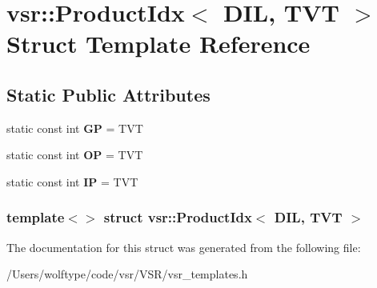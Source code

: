 \hypertarget{structvsr_1_1_product_idx_3_01_d_i_l_00_01_t_v_t_01_4}{\section{vsr\-:\-:Product\-Idx$<$ D\-I\-L, T\-V\-T $>$ Struct Template Reference}
\label{structvsr_1_1_product_idx_3_01_d_i_l_00_01_t_v_t_01_4}
}
\subsection*{Static Public Attributes}
\begin{DoxyCompactItemize}
\item 
\hypertarget{structvsr_1_1_product_idx_3_01_d_i_l_00_01_t_v_t_01_4_a7bf087edbbb47bcb5e2fa84ba460ef31}{static const int {\bfseries G\-P} = T\-V\-T}\label{structvsr_1_1_product_idx_3_01_d_i_l_00_01_t_v_t_01_4_a7bf087edbbb47bcb5e2fa84ba460ef31}

\item 
\hypertarget{structvsr_1_1_product_idx_3_01_d_i_l_00_01_t_v_t_01_4_ab355b46ab54d6a0225fa0f1ddcfc5dde}{static const int {\bfseries O\-P} = T\-V\-T}\label{structvsr_1_1_product_idx_3_01_d_i_l_00_01_t_v_t_01_4_ab355b46ab54d6a0225fa0f1ddcfc5dde}

\item 
\hypertarget{structvsr_1_1_product_idx_3_01_d_i_l_00_01_t_v_t_01_4_a2c8d64ae2d7b9d1b2d1df92d3df4b31f}{static const int {\bfseries I\-P} = T\-V\-T}\label{structvsr_1_1_product_idx_3_01_d_i_l_00_01_t_v_t_01_4_a2c8d64ae2d7b9d1b2d1df92d3df4b31f}

\end{DoxyCompactItemize}
\subsubsection*{template$<$$>$ struct vsr\-::\-Product\-Idx$<$ D\-I\-L, T\-V\-T $>$}



The documentation for this struct was generated from the following file\-:\begin{DoxyCompactItemize}
\item 
/\-Users/wolftype/code/vsr/\-V\-S\-R/vsr\-\_\-templates.\-h\end{DoxyCompactItemize}
